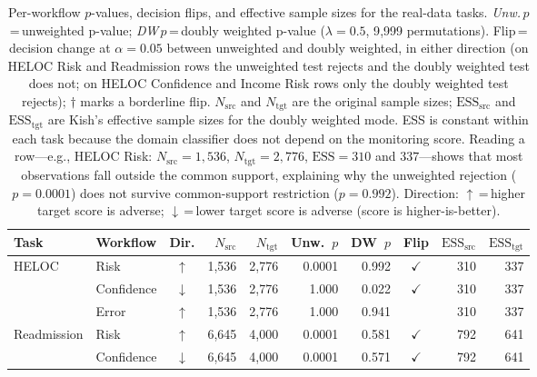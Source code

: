 \begin{table}[!ht]
  \centering
  \footnotesize
  \setlength{\tabcolsep}{3.5pt}
  \caption{%
    Per-workflow $p$-values, decision flips, and effective sample sizes
    for the real-data tasks.
    \emph{Unw.}\,$p$\,=\,unweighted p-value;
    \emph{DW}\,$p$\,=\,doubly weighted p-value ($\lambda = 0.5$, 9{,}999 permutations).
    Flip\,=\,decision change at $\alpha = 0.05$ between unweighted and
    doubly weighted, in either direction (on HELOC Risk and Readmission rows
    the unweighted test rejects and the doubly weighted test does not; on
    HELOC Confidence and Income Risk rows only the doubly weighted test
    rejects); $\dagger$ marks a borderline flip.
    $N_{\mathrm{src}}$ and $N_{\mathrm{tgt}}$ are the original sample sizes;
    $\mathrm{ESS}_{\mathrm{src}}$ and $\mathrm{ESS}_{\mathrm{tgt}}$ are Kish's
    effective sample sizes for the doubly weighted mode.
    ESS is constant within each task because the domain classifier does not
    depend on the monitoring score.
    Reading a row---e.g., HELOC Risk: $N_{\mathrm{src}}=1{,}536$,
    $N_{\mathrm{tgt}}=2{,}776$, $\mathrm{ESS}=310$ and $337$---shows that
    most observations fall outside the common support, explaining why the
    unweighted rejection ($p=0.0001$) does not survive common-support
    restriction ($p=0.992$).
    Direction: $\uparrow$\,=\,higher target score is adverse;
    $\downarrow$\,=\,lower target score is adverse (score is higher-is-better).%
  }
  \label{tab:appendix-results}
  \begin{tabular}{l l c r r r r c r r}
    \toprule
    Task & Workflow & Dir. & $N_{\mathrm{src}}$ & $N_{\mathrm{tgt}}$ &
    Unw.~$p$ & DW~$p$ & Flip & $\mathrm{ESS}_{\mathrm{src}}$ & $\mathrm{ESS}_{\mathrm{tgt}}$ \\
    \midrule
    HELOC        & Risk       & $\uparrow$   & 1{,}536 & 2{,}776 & 0.0001 & 0.992 & $\checkmark$ & 310   & 337   \\
                 & Confidence & $\downarrow$ & 1{,}536 & 2{,}776 & 1.000 & 0.022 & $\checkmark$ & 310   & 337   \\
                 & Error      & $\uparrow$   & 1{,}536 & 2{,}776 & 1.000 & 0.941 &              & 310   & 337   \\
    \cmidrule(lr){1-10}
    Readmission  & Risk       & $\uparrow$   & 6{,}645 & 4{,}000 & 0.0001 & 0.581 & $\checkmark$ & 792   & 641   \\
                 & Confidence & $\downarrow$ & 6{,}645 & 4{,}000 & 0.0001 & 0.571 & $\checkmark$ & 792   & 641   \\

\end{tabular}
\end{table}
